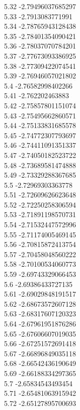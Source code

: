 {5.32	-2.79496037685297\\
5.33	-2.7913083771991\\
5.34	-2.78765943128438\\
5.35	-2.78401354090421\\
5.36	-2.78037070784201\\
5.37	-2.77673093386925\\
5.38	-2.77309422074541\\
5.39	-2.76946057021802\\
5.4	-2.76582998402266\\
5.41	-2.762202463883\\
5.42	-2.75857801151074\\
5.43	-2.75495662860571\\
5.44	-2.75133831685578\\
5.45	-2.74772307793697\\
5.46	-2.74411091351337\\
5.47	-2.74050182523722\\
5.48	-2.73689581474888\\
5.49	-2.73329288367685\\
5.5	-2.72969303363778\\
5.51	-2.72609626623648\\
5.52	-2.72250258306594\\
5.53	-2.71891198570731\\
5.54	-2.71532447572996\\
5.55	-2.71174005469145\\
5.56	-2.70815872413754\\
5.57	-2.70458048560222\\
5.58	-2.70100534060773\\
5.59	-2.69743329066453\\
5.6	-2.69386433727135\\
5.61	-2.69029848191517\\
5.62	-2.68673572607128\\
5.63	-2.68317607120323\\
5.64	-2.67961951876286\\
5.65	-2.67606607019035\\
5.66	-2.67251572691418\\
5.67	-2.66896849035118\\
5.68	-2.66542436190649\\
5.69	-2.66188334297365\\
5.7	-2.65834543493454\\
5.71	-2.65481063915942\\
5.72	-2.65127895700693\\
}
